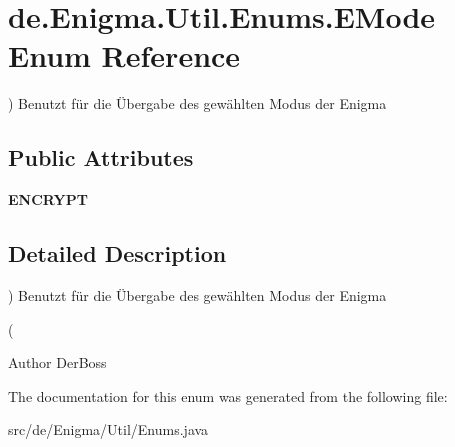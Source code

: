 \hypertarget{enumde_1_1_enigma_1_1_util_1_1_enums_1_1_e_mode}{}\section{de.\+Enigma.\+Util.\+Enums.\+E\+Mode Enum Reference}
\label{enumde_1_1_enigma_1_1_util_1_1_enums_1_1_e_mode}


) Benutzt für die Übergabe des gewählten Modus der Enigma  


\subsection*{Public Attributes}
\begin{DoxyCompactItemize}
\item 
\mbox{\label{enumde_1_1_enigma_1_1_util_1_1_enums_1_1_e_mode_a2506d5250eaa2bc60de3fec91ff5805e}} 
{\bfseries E\+N\+C\+R\+Y\+PT}
\end{DoxyCompactItemize}


\subsection{Detailed Description}
) Benutzt für die Übergabe des gewählten Modus der Enigma 

(\begin{DoxyAuthor}{Author}
Der\+Boss 
\end{DoxyAuthor}


The documentation for this enum was generated from the following file\+:\begin{DoxyCompactItemize}
\item 
src/de/\+Enigma/\+Util/Enums.\+java\end{DoxyCompactItemize}
